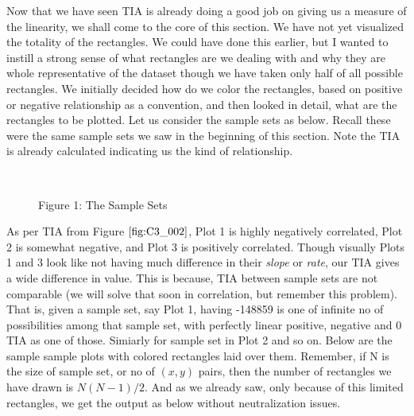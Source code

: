 \documentclass[float=false,crop=false]{standalone}
\begin{document}
Now that we have seen TIA is already doing a good job on giving us a
measure of the linearity, we shall come to the core of this section. We
have not yet visualized the totality of the rectangles. We could have
done this earlier, but I wanted to instill a strong sense of what
rectangles are we dealing with and why they are whole representative of
the dataset though we have taken only half of all possible rectangles.
We initially decided how do we color the rectangles, based on positive
or negative relationship as a convention, and then looked in detail,
what are the rectangles to be plotted. Let us consider the sample sets
as below. Recall these were the same sample sets we saw in the beginning
of this section. Note the TIA is already calculated indicating us the
kind of relationship.
\begin{figure}
\centering%
    \begin{center}
    \end{center}
    { \hspace*{\fill} \\}
    \caption{Figure 1: The Sample Sets} \label{fig:C3_002}
\end{figure}
    As per TIA from Figure \(\ref{fig:C3_002}\), Plot 1 is highly negatively
correlated, Plot 2 is somewhat negative, and Plot 3 is positively
correlated. Though visually Plots 1 and 3 look like not having much
difference in their \emph{slope} or \emph{rate}, our TIA gives a wide
difference in value. This is because, TIA between sample sets are not
comparable (we will solve that soon in correlation, but remember this
problem). That is, given a sample set, say Plot 1, having -148859 is one
of infinite no of possibilities among that sample set, with perfectly
linear positive, negative and 0 TIA as one of those. Simiarly for sample
set in Plot 2 and so on. Below are the sample sample plots with colored
rectangles laid over them. Remember, if N is the size of sample set, or
no of \((x,y)\) pairs, then the number of rectangles we have drawn is
\(N(N-1)/2\). And as we already saw, only because of this limited
rectangles, we get the output as below without neutralization issues.
\end{document}
